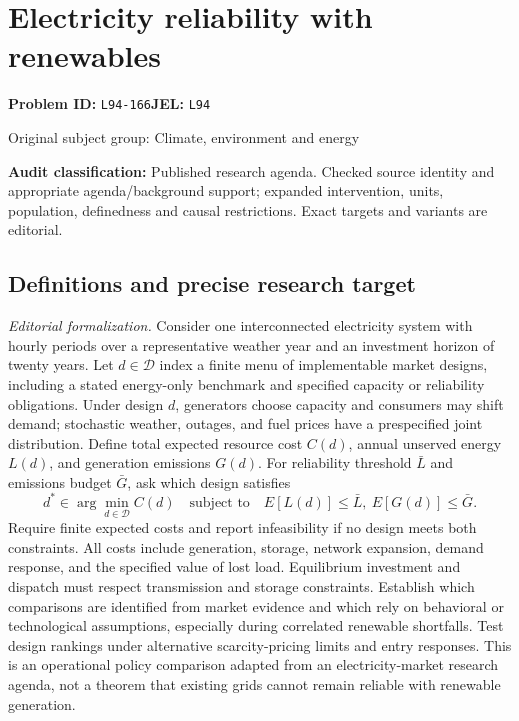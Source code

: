 \documentclass[11pt,a4paper]{article}
\begin{document}
\section*{Electricity reliability with renewables}
\textbf{Problem ID:} \texttt{L94-166}\quad \textbf{JEL:} \texttt{L94}\par
\label{problem:OP-0437}
\label{audited:ECON-069}
{\sffamily\small\color{muted}Original subject group: Climate, environment and energy\par}
\label{definitions:problem:30007719}
\textbf{Audit classification:} Published research agenda. Checked source identity and appropriate agenda/background support; expanded intervention, units, population, definedness and causal restrictions. Exact targets and variants are editorial.
\subsection*{Definitions and precise research target}
\textit{Editorial formalization.} Consider one interconnected electricity system with hourly periods over a representative weather year and an investment horizon of twenty years. Let \(d\in\mathcal D\) index a finite menu of implementable market designs, including a stated energy-only benchmark and specified capacity or reliability obligations. Under design \(d\), generators choose capacity and consumers may shift demand; stochastic weather, outages, and fuel prices have a prespecified joint distribution. Define total expected resource cost \(C(d)\), annual unserved energy \(L(d)\), and generation emissions \(G(d)\). For reliability threshold \(\bar L\) and emissions budget \(\bar G\), ask which design satisfies
\[d^*\in\arg\min_{d\in\mathcal D} C(d)\quad\text{subject to}\quad E[L(d)]\leq\bar L,\ E[G(d)]\leq\bar G.\]
Require finite expected costs and report infeasibility if no design meets both constraints. All costs include generation, storage, network expansion, demand response, and the specified value of lost load. Equilibrium investment and dispatch must respect transmission and storage constraints. Establish which comparisons are identified from market evidence and which rely on behavioral or technological assumptions, especially during correlated renewable shortfalls. Test design rankings under alternative scarcity-pricing limits and entry responses. This is an operational policy comparison adapted from an electricity-market research agenda, not a theorem that existing grids cannot remain reliable with renewable generation.
\end{document}
